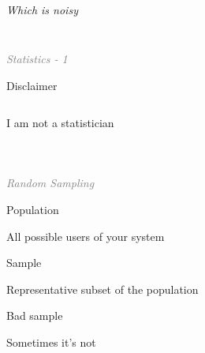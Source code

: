 \documentclass{beamer}
\newcommand{\innersplash}[1]{
  \begin{center}
    \large \textrm{\textit{ #1 } }
  \end{center}
}
\newcommand{\splashslide}[2][{}]{
  \begin{frame}
  \frametitle{#1}
  \innersplash{#2}
  \end{frame}
}
\newcommand{\leadinslide}[2]{
  \splashslide{
     {\fontsize{150}{20}\selectfont{\raisebox{0pt}[90pt][0pt]{\textcolor{light-gray}{#1}}}} \\ \huge \textcolor{gray}{#2}
  }
}
\begin{document}
\splashslide{Which is noisy}

\leadinslide{1}{Statistics - 1}

\begin{frame}{Disclaimer}
  \begin{columns}[t]
  \begin{center}
  \Large{I am not a statistician}
  \end{center}
  \end{columns}  
\end{frame}

\leadinslide{1-1}{Random Sampling}

\begin{frame}{Population}
  \begin{block}{}
  \begin{center}
  All possible users of your system
  \end{center}
  \end{block}
  \parbox[c][0.4\paperheight]{\paperwidth}{ }
\end{frame}

\begin{frame}{Sample}
  \begin{block}{}
  \begin{center}
  Representative subset of the population
  \end{center}
  \end{block}
  \parbox[c][0.4\paperheight]{\paperwidth}{ }
\end{frame}

\begin{frame}{Bad sample}
  \begin{block}{}
  \begin{center}
  Sometimes it's not
  \end{center}
  \end{block}
  \parbox[c][0.4\paperheight]{\paperwidth}{ }
\end{frame}
\end{document}
